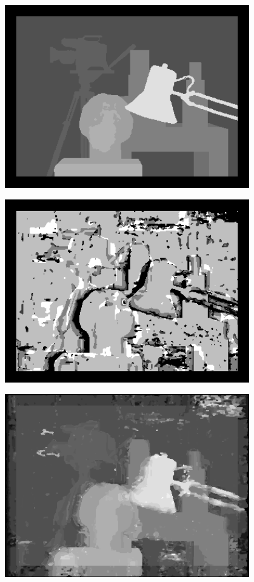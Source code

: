 \documentclass[a4paper]{scrartcl}
\begin{document}
\vspace{1cm}
\begin{minipage}{0.8\textwidth}
  \centering
    \includegraphics[width=0.8\textwidth]{../lab_4_stereo_matching/GT.png}
\end{minipage}

\vspace{1cm}
\begin{minipage}{0.8\textwidth}
  \centering
    \includegraphics[width=0.8\textwidth]{images/opt-block-size.png}
\end{minipage}

\vspace{1cm}
\begin{minipage}{0.8\textwidth}
  \centering
    \includegraphics[width=0.8\textwidth]{images/disparity-gt-ssd-d20-m1.png}
\end{minipage}
\end{document}
